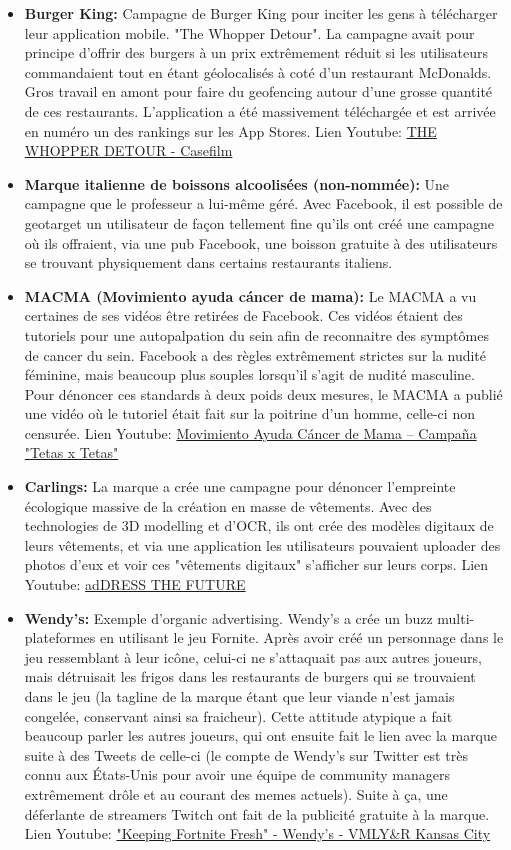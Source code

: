 \begin{itemize}
    \item \textbf{Burger King:} Campagne de Burger King pour inciter les gens à télécharger leur application mobile. "The Whopper Detour". La campagne avait pour principe d'offrir des burgers à un prix extrêmement réduit si les utilisateurs commandaient tout en étant géolocalisés à coté d'un restaurant McDonalds. Gros travail en amont pour faire du geofencing autour d'une grosse quantité de ces restaurants. L'application a été massivement téléchargée et est arrivée en numéro un des rankings sur les App Stores. Lien Youtube: \href{https://www.youtube.com/watch?v=NIWWEyPb8-Y}{THE WHOPPER DETOUR - Casefilm}
    \item \textbf{Marque italienne de boissons alcoolisées (non-nommée):} Une campagne que le professeur a lui-même géré. Avec Facebook, il est possible de geotarget un utilisateur de façon tellement fine qu'ils ont créé une campagne où ils offraient, via une pub Facebook, une boisson gratuite à des utilisateurs se trouvant physiquement dans certains restaurants italiens.
    \item \textbf{MACMA (Movimiento ayuda cáncer de mama):} Le MACMA a vu certaines de ses vidéos être retirées de Facebook. Ces vidéos étaient des tutoriels pour une autopalpation du sein afin de reconnaitre des symptômes de cancer du sein. Facebook a des règles extrêmement strictes sur la nudité féminine, mais beaucoup plus souples lorsqu'il s'agit de nudité masculine. Pour dénoncer ces standards à deux poids deux mesures, le MACMA a publié une vidéo où le tutoriel était fait sur la poitrine d'un homme, celle-ci non censurée. Lien Youtube: \href{https://www.youtube.com/watch?v=ZEbYEGrmkPg}{Movimiento Ayuda Cáncer de Mama -- Campaña "Tetas x Tetas"}
    \item \textbf{Carlings:} La marque a crée une campagne pour dénoncer l'empreinte écologique massive de la création en masse de vêtements. Avec des technologies de 3D modelling et d'OCR, ils ont crée des modèles digitaux de leurs vêtements, et via une application les utilisateurs pouvaient uploader des photos d'eux et voir ces "vêtements digitaux" s'afficher sur leurs corps. Lien Youtube: \href{https://www.youtube.com/watch?v=Sothlpxa6V0}{adDRESS THE FUTURE}
    \item \textbf{Wendy's:} Exemple d'organic advertising. Wendy's a crée un buzz multi-plateformes en utilisant le jeu Fornite. Après avoir créé un personnage dans le jeu ressemblant à leur icône, celui-ci ne s'attaquait pas aux autres joueurs, mais détruisait les frigos dans les restaurants de burgers qui se trouvaient dans le jeu (la tagline de la marque étant que leur viande n'est jamais congelée, conservant ainsi sa fraicheur). Cette attitude atypique a fait beaucoup parler les autres joueurs, qui ont ensuite fait le lien avec la marque suite à des Tweets de celle-ci (le compte de Wendy's sur Twitter est très connu aux États-Unis pour avoir une équipe de community managers extrêmement drôle et au courant des memes actuels). Suite à ça, une déferlante de streamers Twitch ont fait de la publicité gratuite à la marque. Lien Youtube: \href{https://youtu.be/DhdQmDKTBgI}{"Keeping Fortnite Fresh" - Wendy's - VMLY\&R Kansas City}

\end{itemize}
